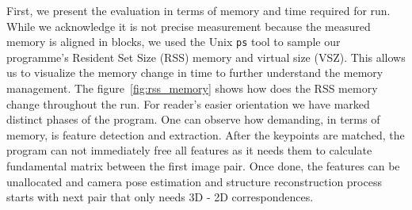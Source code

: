 First, we present the evaluation in terms of memory and time required for run. While we acknowledge it is not precise measurement because the measured memory is aligned in blocks, we used the Unix \texttt{ps} tool to sample our programme's Resident Set Size (RSS) memory and virtual size (VSZ). This allows us to visualize the memory change in time to further understand the memory management. The figure~\ref{fig:rss_memory} shows how does the RSS memory change throughout the run. For reader's easier orientation we have marked distinct phases of the program. One can observe how demanding, in terms of memory, is feature detection and extraction. After the keypoints are matched, the program can not immediately free all features as it needs them to calculate fundamental matrix between the first image pair. Once done, the features can be unallocated and camera pose estimation and structure reconstruction process starts with next pair that only needs 3D - 2D correspondences.
